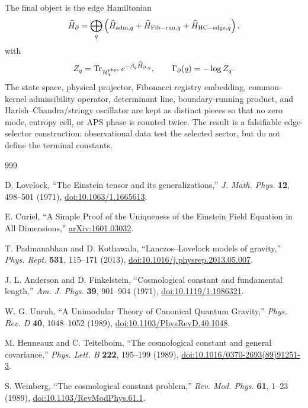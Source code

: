 \documentclass[aps,prd,reprint,nofootinbib,superscriptaddress,floatfix]{revtex4-2}
\numberwithin{equation}{section}
\theoremstyle{definition}
\theoremstyle{plain}
\begin{document}
The final object is the edge Hamiltonian
\[
\widehat H_\partial
=
\bigoplus_q
\left(
\widehat H_{{\rm adm},q}
+
\widehat H_{{\rm Fib-run},q}
+
\widehat H_{{\rm HC-edge},q}
\right),
\]
with
\[
Z_q=\operatorname{Tr}_{\mathcal H_q^{\rm phys}}
e^{-\beta_q\widehat H_{\partial,q}},
\qquad
\Gamma_\partial(q)=-\log Z_q.
\]
The state space, physical projector, Fibonacci registry embedding,
common-kernel admissibility operator, determinant line, boundary-running
product, and Harish--Chandra/stringy oscillator are kept as distinct pieces so
that no zero mode, entropy cell, or APS phase is counted twice.  The result is
a falsifiable edge-selector construction: observational data test the selected
sector, but do not define the terminal constants.

\begin{thebibliography}{999}

D. Lovelock,
``The Einstein tensor and its generalizations,''
\emph{J. Math. Phys.} \textbf{12}, 498--501 (1971),
\href{https://doi.org/10.1063/1.1665613}{doi:10.1063/1.1665613}.

E. Curiel,
``A Simple Proof of the Uniqueness of the Einstein Field Equation in All Dimensions,''
\href{https://arxiv.org/abs/1601.03032}{arXiv:1601.03032}.

T. Padmanabhan and D. Kothawala,
``Lanczos--Lovelock models of gravity,''
\emph{Phys. Rept.} \textbf{531}, 115--171 (2013),
\href{https://doi.org/10.1016/j.physrep.2013.05.007}{doi:10.1016/j.physrep.2013.05.007}.

J. L. Anderson and D. Finkelstein,
``Cosmological constant and fundamental length,''
\emph{Am. J. Phys.} \textbf{39}, 901--904 (1971),
\href{https://doi.org/10.1119/1.1986321}{doi:10.1119/1.1986321}.

W. G. Unruh,
``A Unimodular Theory of Canonical Quantum Gravity,''
\emph{Phys. Rev. D} \textbf{40}, 1048--1052 (1989),
\href{https://doi.org/10.1103/PhysRevD.40.1048}{doi:10.1103/PhysRevD.40.1048}.

M. Henneaux and C. Teitelboim,
``The cosmological constant and general covariance,''
\emph{Phys. Lett. B} \textbf{222}, 195--199 (1989),
\href{https://doi.org/10.1016/0370-2693(89)91251-3}{doi:10.1016/0370-2693(89)91251-3}.

S. Weinberg,
``The cosmological constant problem,''
\emph{Rev. Mod. Phys.} \textbf{61}, 1--23 (1989),
\href{https://doi.org/10.1103/RevModPhys.61.1}{doi:10.1103/RevModPhys.61.1}.



\end{thebibliography}
\end{document}
